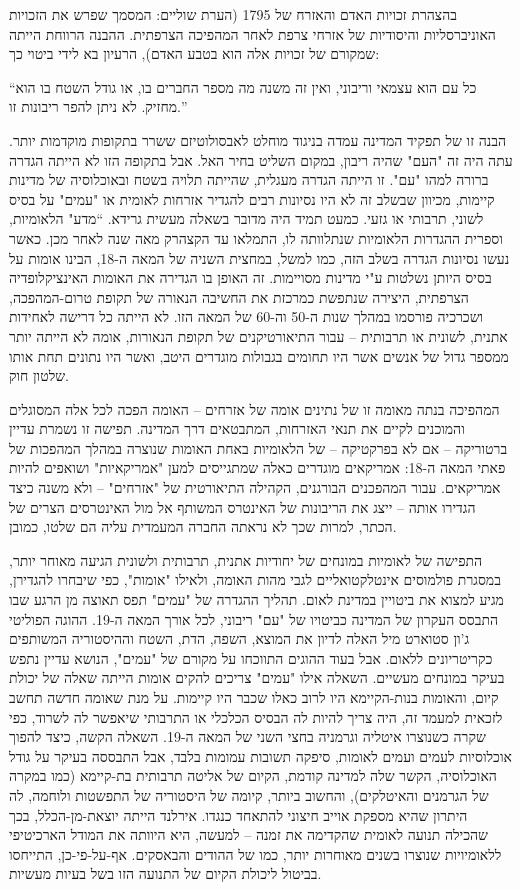 בהצהרת זכויות האדם והאזרח של 1795 (הערת שוליים: המסמך שפרש את הזכויות האוניברסליות והיסודיות של אזרחי צרפת לאחר המהפיכה הצרפתית. ההבנה הרווחת הייתה שמקורם של זכויות אלה הוא בטבע האדם), הרעיון בא לידי ביטוי כך: 

“כל עם הוא עצמאי וריבוני, ואין זה משנה מה מספר החברים בו, או גודל השטח בו הוא מחזיק. לא ניתן להפר ריבונות זו.”

הבנה זו של תפקיד המדינה עמדה בניגוד מוחלט לאבסולוטיזם ששרר בתקופות מוקדמות יותר. עתה היה זה "העם" שהיה ריבון, במקום השליט בחיר האל. אבל בתקופה הזו לא הייתה הגדרה ברורה למהו "עם". זו הייתה הגדרה מעגלית, שהייתה תלויה בשטח ובאוכלוסיה של מדינות קיימות, מכיוון שבשלב זה לא היו נסיונות רבים להגדיר אזרחות לאומית או "עמים" על בסיס לשוני, תרבותי או גזעי. כמעט תמיד היה מדובר בשאלה מעשית גרידא. “מדע" הלאומיות, וספרית ההגדרות הלאומיות שנתלוותה לו, התמלאו עד הקצהרק מאה שנה לאחר מכן. כאשר נעשו נסיונות הגדרה בשלב הזה, כמו למשל, במחצית השניה של המאה ה-18, הבינו אומות על בסיס היותן נשלטות ע"י מדינות מסויימות. זה האופן בו הגדירה את האומות האינציקלופדיה הצרפתית, היצירה שנתפשת כמרכזת את החשיבה הנאורה של תקופת טרום-המהפכה, ושכרכיה פורסמו במהלך שנות ה-50 וה-60 של המאה הזו. לא הייתה כל דרישה לאחידות אתנית, לשונית או תרבותית – עבור התיאורטיקנים של תקופת הנאורות, אומה לא הייתה יותר ממספר גדול של אנשים אשר היו תחומים בגבולות מוגדרים היטב, ואשר היו נתונים תחת אותו שלטון חוק.

המהפיכה בנתה מאומה זו של נתינים אומה של אזרחים – האומה הפכה לכל אלה המסוגלים והמוכנים לקיים את תנאי האזרחות, המתבטאים דרך המדינה. תפישה זו נשמרת עדיין ברטוריקה – אם לא בפרקטיקה – של הלאומיות באחת האומות שנוצרה במהלך המהפכות של פאתי המאה ה-18: אמריקאים מוגדרים כאלה שמתגייסים למען "אמריקאיות" ושואפים להיות אמריקאים. עבור המהפכנים הבורגנים, הקהילה התיאורטית של "אזרחים" – ולא משנה כיצד הגדירו אותה – ייצג את הריבונות של האינטרס המשותף אל מול האינטרסים הצרים של הכתר, למרות שכך לא נראתה החברה המעמדית עליה הם שלטו, כמובן.

התפישה של לאומיות במונחים של יחודיות אתנית, תרבותית ולשונית הגיעה מאוחר יותר, במסגרת פולמוסים אינטלקטואליים לגבי מהות האומה, ולאילו "אומות", כפי שיבחרו להגדירן, מגיע למצוא את ביטויין במדינת לאום. תהליך ההגדרה של "עמים" תפס תאוצה מן הרגע שבו התבסס העקרון של המדינה כביטויו של "עם" ריבוני, לכל אורך המאה ה-19. ההוגה הפוליטי ג'ון סטוארט מיל האלה לדיון את המוצא, השפה, הדת, השטח וההיסטוריה המשותפים כקריטריונים ללאום. אבל בעוד ההוגים התווכחו על מקורם של "עמים", הנושא עדיין נתפש בעיקר במונחים מעשיים. השאלה אילו "עמים" צריכים להקים אומות הייתה שאלה של יכולת קיום, והאומות בנות-הקיימא היו לרוב כאלו שכבר היו קיימות. על מנת שאומה חדשה תחשב לזכאית למעמד זה, היה צריך להיות לה הבסיס הכלכלי או התרבותי שיאפשר לה לשרוד, כפי שקרה כשנוצרו איטליה וגרמניה בחצי השני של המאה ה-19. השאלה הקשה, כיצד להפוך אוכלוסיות לעמים ועמים לאומות, סיפקה תשובות עמומות בלבד, אבל התבססה בעיקר על גודל האוכלוסיה, הקשר שלה למדינה קודמת, הקיום של אליטה תרבותית בת-קיימא (כמו במקרה של הגרמנים והאיטלקים), והחשוב ביותר, קיומה של היסטוריה של התפשטות ולוחמה, לה היתרון שהיא מספקת אוייב חיצוני להתאחד כנגדו. אירלנד הייתה יוצאת-מן-הכלל, בכך שהכילה תנועה לאומית שהקדימה את זמנה – למעשה, היא היוותה את המודל הארכיטיפי ללאומיויות שנוצרו בשנים מאוחרות יותר, כמו של ההודים והבאסקים. אף-על-פי-כן, התייחסו בביטול ליכולת הקיום של התנועה הזו בשל בעיות מעשיות.

